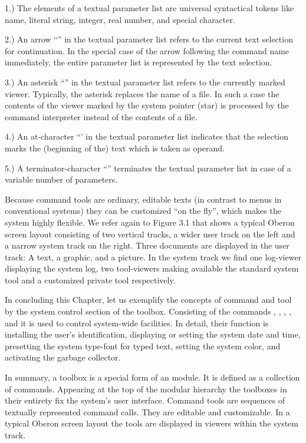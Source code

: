 1.) The elements of a textual parameter list are universal syntactical tokens like name, literal string, integer, real number, and special character.

2.) An arrow ``\code{\^\/}'' in the textual parameter list refers to the current text selection for continuation. In the special case of the arrow following the command name immediately, the entire parameter list is represented by the text selection.

3.) An asterisk ``\code{*}'' in the textual parameter list refers to the currently marked viewer. Typically, the asterisk replaces the name of a file. In such a case the contents of the viewer marked by the system pointer (star) is processed by the command interpreter instead of the contents of a file.

4.) An at-character ``' in the textual parameter list indicates that the selection marks the (beginning of the) text which is taken as operand.

5.) A terminator-character ``\code{\~{}}'' terminates the textual parameter list in case of a variable number of parameters.

Because command tools are ordinary, editable texts (in contrast to
menus in conventional systems) they can be customized ``on the fly'',
which makes the system highly flexible. We refer again to Figure 3.1
that shows a typical Oberon screen layout consisting of two vertical
tracks, a wider user track on the left and a narrow system track on
the right. Three documents are displayed in the user track: A text, a
graphic, and a picture. In the system track we find one log-viewer
displaying the system log, two tool-viewers making available the
standard system tool and a customized private tool respectively.

In concluding this Chapter, let us exemplify the concepts of command
and tool by the system control section of the 
toolbox. Consisting of the commands , ,
, , and  it is used to control
system-wide facilities. In detail, their function is installing the
user's identification, displaying or setting the system date and time,
presetting the system type-font for typed text, setting the system
color, and activating the garbage collector.

In summary, a toolbox is a special form of an  module. It is
defined as a collection of commands. Appearing at the top of the
modular hierarchy the toolboxes in their entirety fix the system’s
user interface. Command tools are sequences of textually represented
command calls. They are editable and customizable. In a typical Oberon
screen layout the tools are displayed in viewers within the system
track.


